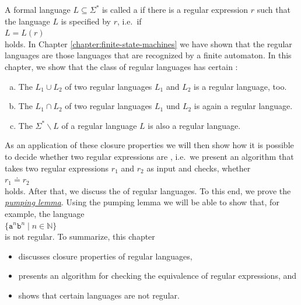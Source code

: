 A formal language $L \subseteq \Sigma^*$ is called a  
if there is a regular expression $r$ such that the language $L$ is specified by $r$, i.e.~if
\\[0.2cm]
\hspace*{1.3cm}
$L = L(r)$ 
\\[0.2cm]
holds.  In Chapter \ref{chapter:finite-state-machines} we have shown that the regular languages
are those languages that are recognized by a finite automaton.  In this chapter, we show
that the class of regular languages has certain :
\begin{enumerate}[(a)]
\item The  $L_1 \cup L_2$ of two regular languages $L_1$ and $L_2$ is a regular language, too.
\item The  $L_1 \cap L_2$ of two regular languages $L_1$ und $L_2$ is again a regular language.
\item The   $\Sigma^* \backslash L$ of a regular language $L$
      is also a regular language.
\end{enumerate}
As an application of these closure properties we will then show how it is possible to decide whether two
regular expressions are , i.e.~we present an algorithm that takes two regular expressions
$r_1$ and $r_2$ as input and checks, whether 
\\[0.2cm]
\hspace*{1.3cm}
$r_1 \doteq r_2$
\\[0.2cm]
holds.  After that, we discuss the  of regular languages.  To this end, we prove the
\href{http://en.wikipedia.org/wiki/Pumping_lemma_for_regular_languages}{\emph{pumping lemma}}.
Using the pumping lemma we will be able to show that, for example, the language
\\[0.2cm]
\hspace*{1.3cm} $\{ \mathtt{a}^n \mathtt{b}^n \mid n \in \mathbb{N} \}$
\\[0.2cm]
is not regular.  To summarize, this chapter 
\begin{itemize}
\item discusses closure properties of regular languages,
\item presents an algorithm for checking the equivalence of regular expressions, and
\item shows that certain languages are not regular.
\end{itemize}


